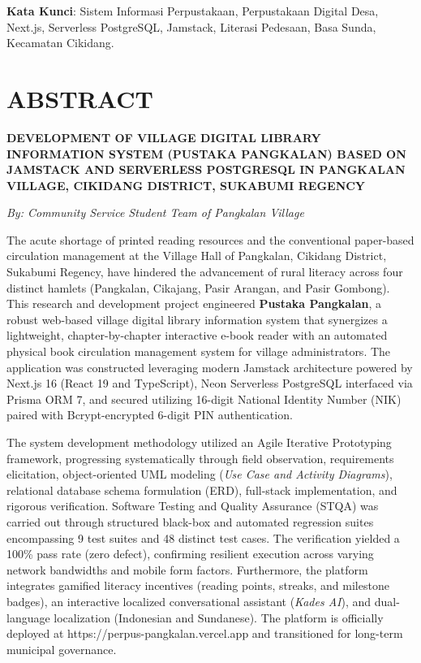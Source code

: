 \documentclass[
  indonesian,
  12pt,
]{report}
\begin{document}
\textbf{Kata Kunci}: Sistem Informasi Perpustakaan, Perpustakaan Digital
Desa, Next.js, Serverless PostgreSQL, Jamstack, Literasi Pedesaan, Basa
Sunda, Kecamatan Cikidang.

\newpage

\chapter*{ABSTRACT}\label{abstract}

\textbf{DEVELOPMENT OF VILLAGE DIGITAL LIBRARY INFORMATION SYSTEM
(PUSTAKA PANGKALAN) BASED ON JAMSTACK AND SERVERLESS POSTGRESQL IN
PANGKALAN VILLAGE, CIKIDANG DISTRICT, SUKABUMI REGENCY}

\emph{By: Community Service Student Team of Pangkalan Village}

The acute shortage of printed reading resources and the conventional
paper-based circulation management at the Village Hall of Pangkalan,
Cikidang District, Sukabumi Regency, have hindered the advancement of
rural literacy across four distinct hamlets (Pangkalan, Cikajang, Pasir
Arangan, and Pasir Gombong). This research and development project
engineered \textbf{Pustaka Pangkalan}, a robust web-based village
digital library information system that synergizes a lightweight,
chapter-by-chapter interactive e-book reader with an automated physical
book circulation management system for village administrators. The
application was constructed leveraging modern Jamstack architecture
powered by Next.js 16 (React 19 and TypeScript), Neon Serverless
PostgreSQL interfaced via Prisma ORM 7, and secured utilizing 16-digit
National Identity Number (NIK) paired with Bcrypt-encrypted 6-digit PIN
authentication.

The system development methodology utilized an Agile Iterative
Prototyping framework, progressing systematically through field
observation, requirements elicitation, object-oriented UML modeling
(\emph{Use Case and Activity Diagrams}), relational database schema
formulation (ERD), full-stack implementation, and rigorous verification.
Software Testing and Quality Assurance (STQA) was carried out through
structured black-box and automated regression suites encompassing 9 test
suites and 48 distinct test cases. The verification yielded a 100\% pass
rate (zero defect), confirming resilient execution across varying
network bandwidths and mobile form factors. Furthermore, the platform
integrates gamified literacy incentives (reading points, streaks, and
milestone badges), an interactive localized conversational assistant
(\emph{Kades AI}), and dual-language localization (Indonesian and
Sundanese). The platform is officially deployed at
https://perpus-pangkalan.vercel.app and transitioned for long-term
municipal governance.
\end{document}
